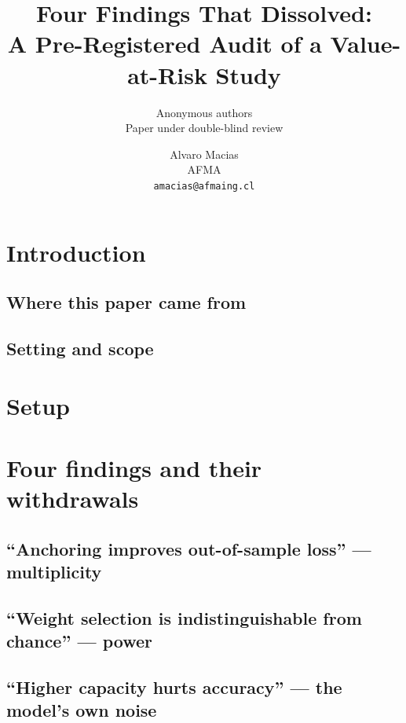 \documentclass[11pt]{article}
\title{Four Findings That Dissolved:\\A Pre-Registered Audit of a Value-at-Risk Study}
\author{Anonymous authors\\Paper under double-blind review}
\author{%
    Alvaro Macias\\
    AFMA\\
    \texttt{amacias@afmaing.cl}
  }
\date{}
\begin{document}
\maketitle

\begin{abstract}

\end{abstract}

\section{Introduction}\label{sec:intro}


\subsection{Where this paper came from}\label{sec:provenance}


\subsection{Setting and scope}\label{sec:scope}


\section{Setup}\label{sec:setup}


\section{Four findings and their withdrawals}\label{sec:findings}


\subsection{``Anchoring improves out-of-sample loss'' --- multiplicity}\label{sec:multiplicity}


\subsection{``Weight selection is indistinguishable from chance'' --- power}\label{sec:power}


\subsection{``Higher capacity hurts accuracy'' --- the model's own noise}\label{sec:capacity}

\end{document}
